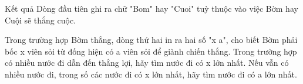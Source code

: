 Kết quả  
Dòng đầu tiên ghi ra chữ "Bom" hay "Cuoi" tuỳ thuộc vào việc Bờm hay Cuội sẽ thắng cuộc.  

   Trong trường hợp Bờm thắng, dòng thứ hai in ra hai số "x a", cho biết Bờm phải bốc x viên sỏi từ đống hiện có a viên sỏi để giành chiến thắng. Trong trường hợp có nhiều nước đi dẫn đến thắng lợi, hãy tìm nước đi có x lớn nhất. Nếu vẫn có nhiều nước đi, trong số các nước đi có x lớn nhất, hãy tìm nước đi có a lớn nhất.